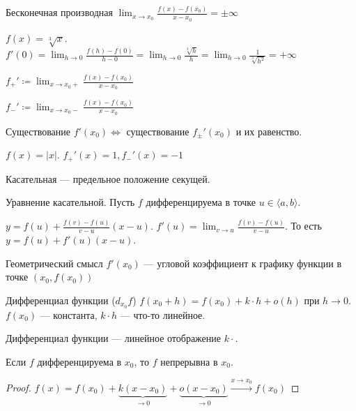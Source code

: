 \begin{definition}
    Бесконечная производная $\lim_{x\to x_0}\frac{f(x) - f(x_0)}{x - x_0} = \pm \infty$
\end{definition}
\begin{example}
    $f(x) = \sqrt[3]{x}$.  $f'(0) = \lim_{h\to 0} \frac{f(h) - f(0)}{h - 0} = \lim_{h \to 0} \frac{\sqrt[3]{h}}{h} = \lim_{h \to 0} \frac{1}{\sqrt[3]{h^2}} = +\infty$
\end{example}
\begin{definition}
    $f_+' \coloneqq \lim_{x\to x_0+} \frac{f(x)-f(x_0)}{x-x_0}$

    $f_-' \coloneqq \lim_{x\to x_0-} \frac{f(x)-f(x_0)}{x-x_0}$
\end{definition}
\begin{remark}
    Существование  $f'(x_0) \iff$ существование $f_{\pm}'(x_0)$ и их равенство.
\end{remark}
\begin{example}
    $f(x) = |x|$.  $f_+'(x) = 1, f_-'(x)=-1$
\end{example}
\begin{definition}
    Касательная --- предельное положение секущей.
\end{definition}
\begin{example}
    Уравнение касательной. Пусть $f$ дифференцируема в точке  $u \in \langle a, b \rangle$.

    $y = f(u) + \frac{f(v) - f(u)}{v - u}(x - u)$. $f'(u) = \lim_{v \to u}\frac{f(v) - f(u)}{v - u}$. То есть $y = f(u) + f'(u)(x-u)$.
\end{example}

Геометрический смысл $f'(x_0)$ --- угловой коэффициент к графику функции в точке $(x_0, f(x_0))$

\begin{definition}
	Дифференциал функции ($d_{x_0}f$) $f(x_0+h) = f(x_0) + k \cdot h + o(h)$ при  $h \to 0$.  $f(x_0)$ --- константа, $k \cdot h$ --- что-то линейное.
    
    Дифференциал функции ---  линейное отображение $k \cdot$.
\end{definition}
\begin{statement}
    Если $f$ дифференцируема в  $x_0$, то  $f$ непрерывна в  $x_0$.
\end{statement}
\begin{proof}
    $f(x) = f(x_0)+\underbrace{k(x-x_0)}_{\to 0}+\underbrace{o(x-x_0)}_{\to 0} \xrightarrow{x \to x_0} f(x_0)$
\end{proof}

